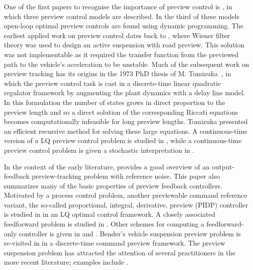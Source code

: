 One of the first papers to recognise the importance of preview control is \cite{Sheridan}, in which three preview control models are described. In the third of these models open-loop optimal preview controls are found using dynamic programming. The earliest applied work on preview control dates back to \cite{Bender_1968_PrevSusp}, where Wiener filter theory was used to design an active suspension with road preview. This solution was not implementable as it required the transfer function from the previewed path to the vehicle's acceleration to be unstable. Much of the subsequent work on preview tracking has its origins in the 1973 PhD thesis of M. Tomizuka~\cite{Tomi_1973_Thesis}, in which  the preview control task is cast in a discrete-time linear quadratic regulator framework by augmenting the plant dynamics with a delay line model. In this formulation the number of states grows in direct proportion to the preview length and so a direct solution of the corresponding Riccati equations becomes computationally infeasible for long preview lengths. Tomizuka presented an efficient recursive method for solving these large equations. A continuous-time version of a LQ preview control problem is studied in \cite{Tomizuka_1975_ContinuousLQPreview}, while a continuous-time preview control problem is given a stochastic interpretation in \cite{Lindquist}.

In the context of the early literature, \cite{Tomizuka_1975_OptDiscretePreview} provides a good overview of an output-feedback preview-tracking problem with reference noise. This paper also summarizes many of the basic properties of preview feedback controllers. 
Motivated by a process control problem, another previewable command reference variant, the so-called proportional, integral, derivative, preview (PIDP) controller is studied in \cite{Tomizuka_1979_IntegralPreviewFI} in an LQ optimal control framework. A closely associated feedforward problem is studied in \cite{Tomi_1980_FFPrev}. Other schemes for computing a feedforward-only controller is given in \cite{Zattoni_2006_H2PreviewFF} and \cite{Marro_2005_FFH2Preview}. Bender's vehicle suspension preview problem is re-visited in \cite{Tomi_1976_SuspRevisited} in a discrete-time command preview framework. The preview suspension problem has attracted the attention of several practitioners in the more recent literature; examples include \cite{Hac_1992_Opt_Veh_Susp,Marzbanrad_2004_SuspPrev,Roh_1999_Stoc_Opt_Prev,Sharp_2005_CarHandlingPreview}.

